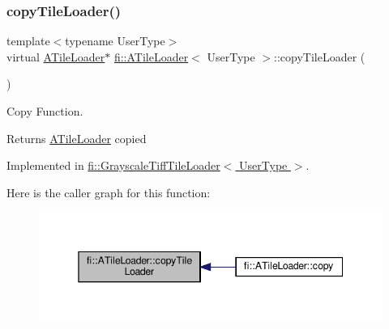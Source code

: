 \subsubsection{\texorpdfstring{copy\+Tile\+Loader()}{copyTileLoader()}}
{\footnotesize\ttfamily template$<$typename User\+Type$>$ \\
virtual \hyperlink{classfi_1_1ATileLoader}{A\+Tile\+Loader}$\ast$ \hyperlink{classfi_1_1ATileLoader}{fi\+::\+A\+Tile\+Loader}$<$ User\+Type $>$\+::copy\+Tile\+Loader (\begin{DoxyParamCaption}{ }\end{DoxyParamCaption})\hspace{0.3cm}{\ttfamily [pure virtual]}}



Copy Function. 

\begin{DoxyReturn}{Returns}
\hyperlink{classfi_1_1ATileLoader}{A\+Tile\+Loader} copied 
\end{DoxyReturn}


Implemented in \hyperlink{classfi_1_1GrayscaleTiffTileLoader_a57eb82e8bcdf71d2cd5f16f93bbe24a4}{fi\+::\+Grayscale\+Tiff\+Tile\+Loader$<$ User\+Type $>$}.

Here is the caller graph for this function\+:
\nopagebreak
\begin{figure}[H]
\begin{center}
\leavevmode
\includegraphics[width=345pt]{dc/d54/classfi_1_1ATileLoader_a99bd30a8283474c5bf667054a83a008d_icgraph}
\end{center}
\end{figure}
\mbox{\label{classfi_1_1ATileLoader_a69b1eaf0e9f636f756f514bd985a4cb5}} 
